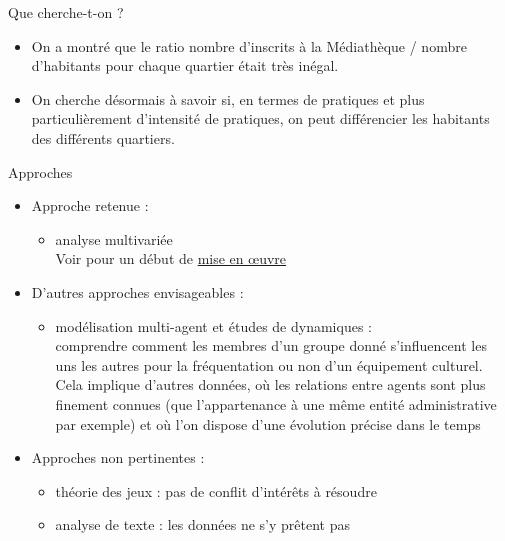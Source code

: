 \documentclass{beamer}
\begin{document}
\begin{frame}{Que cherche-t-on ?}
	\begin{itemize}
		\item On a montré que le ratio nombre d'inscrits à la Médiathèque / nombre d'habitants pour chaque quartier était très inégal.
		\item On cherche désormais à savoir si, en termes de pratiques et plus particulièrement d'intensité de pratiques, on peut différencier les habitants des différents quartiers.
	\end{itemize}
\end{frame}

\begin{frame}{Approches}
	\begin{itemize}
		\item Approche retenue :
		\begin{itemize}
			\item analyse multivariée \\ Voir pour un début de \href{https://github.com/ragbx/aqm/blob/master/02_analyse_donnees.ipynb}{mise en œuvre}
		\end{itemize}
		\item D'autres approches envisageables :
		\begin{itemize}
			\item modélisation multi-agent et études de dynamiques :\\
			comprendre comment les membres d'un groupe donné s'influencent les uns les autres pour la fréquentation ou non d'un équipement culturel.\\
			Cela implique d'autres données, où les relations entre agents sont plus finement connues (que l'appartenance à une même entité administrative par exemple) et où l'on dispose d'une évolution précise dans le temps 
		\end{itemize}
		\item Approches non pertinentes :
		\begin{itemize}
			\item théorie des jeux : pas de conflit d'intérêts à résoudre
			\item analyse de texte : les données ne s'y prêtent pas
		\end{itemize}	
	\end{itemize}
\end{frame}
\end{document}
